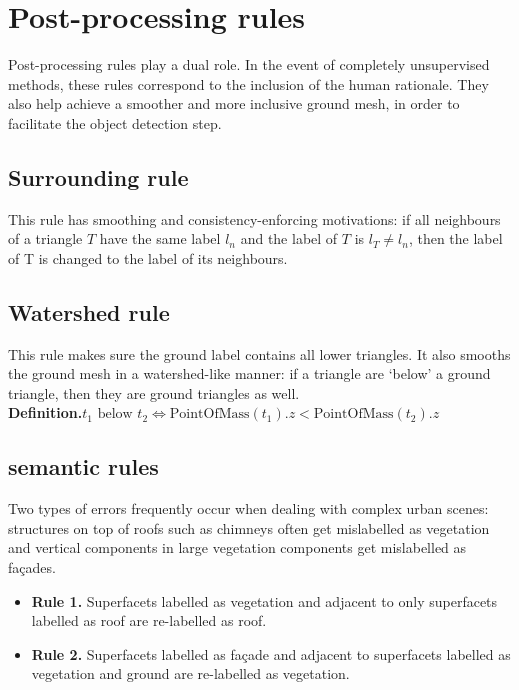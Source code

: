 \documentclass{kththesis}
\begin{document}
\section{Post-processing rules}
Post-processing rules play a dual role. In the event of completely unsupervised methods, these rules correspond to the inclusion of the human rationale. They also help achieve a smoother and more inclusive ground mesh, in order to facilitate the object detection step. 
\subsection{Surrounding rule}
This rule has smoothing and consistency-enforcing motivations: if all neighbours of a triangle $T$ have the same label $l_n$ and the label of $T$ is $l_T \neq l_n$, then the label of T is changed to the label of its neighbours. 
\subsection{Watershed rule}
This rule makes sure the ground label contains all lower triangles. It also smooths the ground mesh in a watershed-like manner: if a triangle are ‘below’ a ground triangle, then they are ground triangles as well. \\
\textbf{Definition.}$t_1 \text{ below } t_2 \iff \text{PointOfMass}(t_1).z < \text{PointOfMass}(t_2).z$


\subsection{\textcite{verdie} semantic rules }
Two types of errors frequently
occur when dealing with complex urban scenes: structures on top of roofs such as chimneys often get mislabelled as vegetation and vertical components in large vegetation components get mislabelled as façades. 
\begin{itemize}
    \item \textbf{Rule 1.} Superfacets labelled as vegetation and adjacent to only superfacets labelled as roof are re-labelled as roof. 
    \item \textbf{Rule 2.} Superfacets labelled as façade and adjacent to superfacets labelled as vegetation and ground are re-labelled as vegetation.
\end{itemize}
\end{document}
